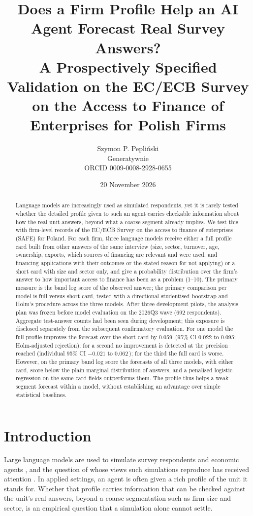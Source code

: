 \documentclass[11pt]{article}
\title{Does a Firm Profile Help an AI Agent Forecast Real Survey Answers?\\
\large A Prospectively Specified Validation on the EC/ECB Survey on the Access to Finance of Enterprises for Polish Firms}
\author{Szymon P. Pepliński\\ \small Generatywnie\\ \small ORCID 0009-0008-2928-0655}
\date{20 November 2026}
\newcommand{\nats}{\,\text{nats}}
\begin{document}
\maketitle

\begin{abstract}
Language models are increasingly used as simulated respondents, yet it is rarely tested whether the detailed
profile given to such an agent carries checkable information about how the real unit answers, beyond what a coarse
segment already implies. We test this with firm-level records of the EC/ECB Survey on the access to finance of
enterprises (SAFE) for Poland. For each firm, three language models receive either a full profile card built from
other answers of the same interview (size, sector, turnover, age, ownership, exports, which sources of financing are
relevant and were used, and financing applications with their outcomes or the stated reason for not applying) or a
short card with size and sector only, and give a probability distribution over the firm's answer to how important access
to finance has been as a problem (1--10). The primary measure is the band log score of the observed answer; the
primary comparison per model is full versus short card, tested with a directional studentised bootstrap and Holm's
procedure across the three models. After three development pilots, the analysis plan was frozen before model
evaluation on the 2026Q3 wave (692 respondents). Aggregate test-answer counts had been seen during development;
this exposure is disclosed separately from the subsequent confirmatory evaluation. For one model the full profile improves
the forecast over the short card by 0.059\nats{} (95\% CI 0.022 to 0.095; Holm-adjusted rejection); for a second no
improvement is detected at the precision reached (individual 95\% CI $-0.021$ to $0.062$\nats); for the third the full card is worse.
However, on the primary band log score the forecasts of all three models, with either card, score below the plain
marginal distribution of answers, and a penalised logistic regression on the same card fields outperforms them. The profile thus helps a weak segment
forecast within a model, without establishing an advantage over simple statistical baselines.
\end{abstract}

\section{Introduction}

Large language models are used to simulate survey respondents and economic agents
\citep{argyle2023,horton2023,aher2023}, and the question of whose views such simulations reproduce has received
attention \citep{santurkar2023}. In applied settings, an agent is often given a rich profile of the unit it stands
for. Whether that profile carries information that can be checked against the unit's real answers, beyond a coarse
segmentation such as firm size and sector, is an empirical question that a simulation alone cannot settle.
\end{document}
